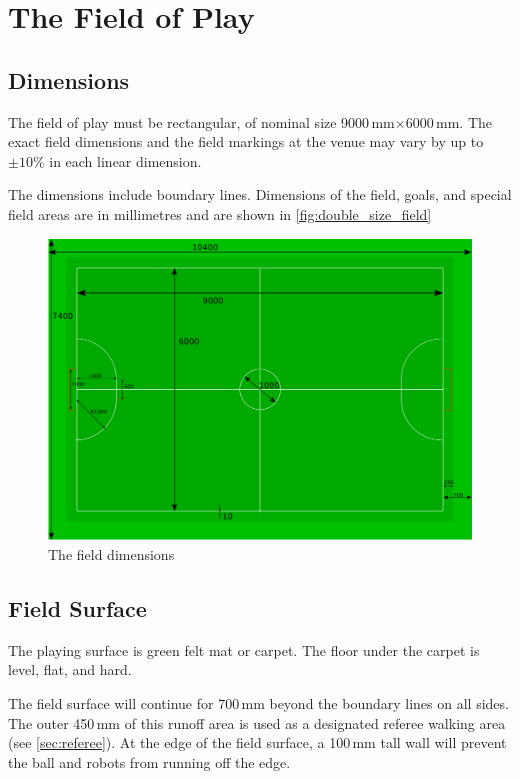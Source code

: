 \section{The Field of Play}\label{sec:field-of-play}

\subsection{Dimensions}
The field of play must be rectangular,
of nominal size 9000\,mm$\times$6000\,mm.
The exact field dimensions and the field markings at the venue may vary by up
to $\pm10\%$ in each linear dimension.

The dimensions include boundary lines.
Dimensions of the field, goals, and special field areas are in millimetres and
are shown in \autoref{fig:double_size_field}

\begin{figure}[ht] %
  \centering
  \includegraphics[width=0.8\columnwidth]{img/double-size-field.png}
  \caption{The field dimensions}
  \label{fig:double_size_field}
\end{figure}


\subsection{Field Surface}
The playing surface is green felt mat or carpet.
The floor under the carpet is level, flat, and hard.

The field surface will continue for 700\,mm beyond
the boundary lines on all sides.
The outer 450\,mm of this runoff area is used as a
designated referee walking area (see \autoref{sec:referee}).
At the edge of the field surface, a 100\,mm tall wall will prevent the ball and
robots from running off the edge.

